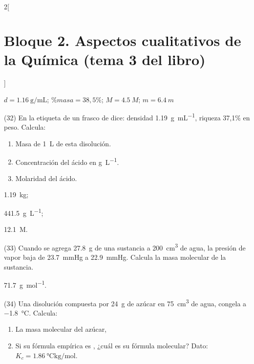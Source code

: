 \documentclass[10pt]{article}
\begin{document}
\begin{multicols}{2}[
    \section{Bloque 2. Aspectos cualitativos de la Química (tema 3 del libro)}
  ]
\begin{solution}
  \( d = \SI{1.16}{\gram\per\milli\liter} \); \( \%masa= 38,5\% \); \( M= \SI{4.5}{M} \); \( m= \SI{6.4}{m} \)
\end{solution}




\begin{exercise}[
    tags    = {},
    topics  = {química,química básica},
    source  = {FQ 1B MGH 2016, p85, e32},
  ]
  (32) En la etiqueta de un frasco de  dice: densidad \SI{1.19}{\gram\per\milli\liter}, riqueza 37,1\% en peso. Calcula:
  \begin{enumerate}
    \item Masa de \SI{1}{\liter} de esta disolución.
    \item Concentración del ácido en \si{\gram\per\liter}.
    \item Molaridad del ácido.
  \end{enumerate}
\end{exercise}

\begin{solution}
  \begin{enumerate*}
    \item \SI{1,19}{\kilo\gram};
    \item \SI{441,5}{\gram\per\liter};
    \item \SI{12,1}{M}.
  \end{enumerate*}
\end{solution}




\begin{exercise}[
    tags    = {},
    topics  = {química,química básica},
    source  = {FQ 1B MGH 2016, p85, e33},
  ]
  (33) Cuando se agrega \SI{27.8}{\gram} de una sustancia a \SI{200}{\cubic\centi\meter} de agua, la presión de vapor baja de \SI{23.7}{\mmHg} a \SI{22.9}{\mmHg}. Calcula la masa molecular de la sustancia.
\end{exercise}

\begin{solution}
  \SI{71.7}{\gram\per\mole}.
\end{solution}




\begin{exercise}[
    tags    = {},
    topics  = {química,química básica},
    source  = {FQ 1B MGH 2016, p85, e34},
  ]
  (34) Una disolución compuesta por \SI{24}{\gram} de azúcar en \SI{75}{\cubic\centi\meter} de agua, congela a \SI{-1.8}{\celsius}. Calcula:
  \begin{enumerate}
    \item La masa molecular del azúcar,
    \item Si su fórmula empírica es , ¿cuál es su fórmula molecular? Dato: \( K_c = \SI{1.86}{\celsius\kilo\gram\per\mole} \).
  \end{enumerate}
\end{exercise}


\end{multicols}
\end{document}
